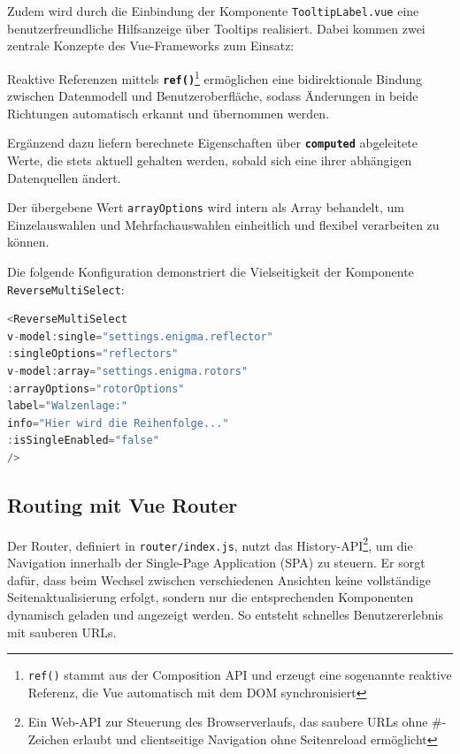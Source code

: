 \documentclass[12pt, ngerman, a4paper, numbers=noenddot]{article}
\begin{document}
Zudem wird durch die Einbindung der Komponente \lstinline|TooltipLabel.vue| eine benutzerfreundliche Hilfsanzeige über Tooltips realisiert. Dabei kommen zwei zentrale Konzepte des Vue-Frameworks zum Einsatz: 

Reaktive Referenzen mittels \textbf{\lstinline|ref()|}\footnote{\texttt{ref()} stammt aus der Composition API und erzeugt eine sogenannte reaktive Referenz, die Vue automatisch mit dem DOM synchronisiert} ermöglichen eine bidirektionale Bindung zwischen Datenmodell und Benutzeroberfläche, sodass Änderungen in beide Richtungen automatisch erkannt und übernommen werden. 

Ergänzend dazu liefern berechnete Eigenschaften über \textbf{\lstinline|computed|} abgeleitete Werte, die stets aktuell gehalten werden, sobald sich eine ihrer abhängigen Datenquellen ändert.


Der übergebene Wert \lstinline|arrayOptions| wird intern als Array behandelt, um Einzelauswahlen und Mehrfachauswahlen einheitlich und flexibel verarbeiten zu können.

\newpage
Die folgende Konfiguration demonstriert die Vielseitigkeit der Komponente \newline \lstinline|ReverseMultiSelect|:

\begin{lstlisting}[language=JavaScript, caption=Verwendung von ReverseMultiSelect in Vue]
<ReverseMultiSelect 
v-model:single="settings.enigma.reflector" 
:singleOptions="reflectors"
v-model:array="settings.enigma.rotors" 
:arrayOptions="rotorOptions" 
label="Walzenlage:"
info="Hier wird die Reihenfolge..."
:isSingleEnabled="false" 
/>
\end{lstlisting}




\subsection{Routing mit Vue Router}

Der Router, definiert in \lstinline|router/index.js|, nutzt das History-API\footnote{Ein Web-API zur Steuerung des Browserverlaufs, das saubere URLs ohne \#-Zeichen erlaubt und clientseitige Navigation ohne Seitenreload ermöglicht}, um die Navigation innerhalb der Single-Page Application (SPA) zu steuern. Er sorgt dafür, dass beim Wechsel zwischen verschiedenen Ansichten keine vollständige Seitenaktualisierung erfolgt, sondern nur die entsprechenden Komponenten dynamisch geladen und angezeigt werden. So entsteht schnelles Benutzererlebnis mit sauberen URLs.
\end{document}

